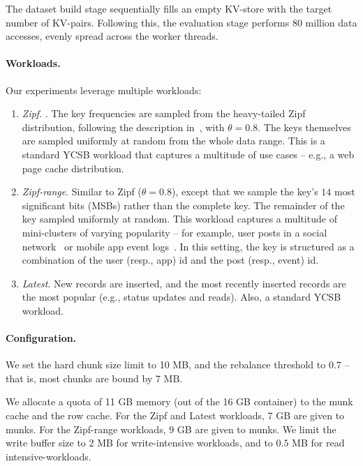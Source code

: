 The dataset build stage sequentially fills an empty KV-store with the target number of KV-pairs. Following this, 
the evaluation stage performs 80 million data accesses, evenly spread across the worker threads.   

\paragraph{Workloads.} 

Our experiments leverage multiple workloads: 

\begin{enumerate}
\item {\em Zipf}. . The key frequencies are sampled from the heavy-tailed Zipf distribution, 
following the description in~\cite{?}, with $\theta = 0.8$. The keys themselves are sampled 
uniformly at random from the whole data range. This is a standard YCSB workload that captures
a multitude of use cases -- e.g., a web page cache distribution. 

\item {\em Zipf-range}. Similar to Zipf ($\theta=0.8$), except that we sample the key's $14$ most significant bits
(MSBs) rather than the complete key. The remainder of the key sampled uniformly at random. This workload
captures a multitude of mini-clusters of varying popularity -- for example, user posts in a social 
network~\cite{linkbench} or mobile app event logs~\cite{flurry}. In this setting, the key is structured
as a combination of the user (resp., app) id and the post (resp., event) id.  

\item {\em Latest}. New records are inserted, and the most recently inserted records are the 
most popular (e.g., status updates and reads). Also, a standard YCSB workload.  

\end{enumerate}

\paragraph{Configuration.} 

We set the \sys\/ hard chunk size limit to 10 MB, and the rebalance threshold to $0.7$ -- that is, 
most chunks are bound by 7 MB. 

We allocate a quota of 11 GB memory (out of the 16 GB container) to the munk cache and the row cache. 
For the Zipf and Latest workloads, 7 GB are given to munks. For the Zipf-range workloads, 9 GB 
are given to munks.  We limit the write buffer size to 2 MB for write-intensive workloads, and to $0.5$ MB 
for read intensive-workloads. 
  
